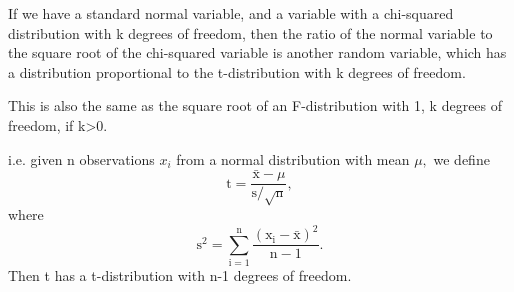 If we have a standard normal variable, and a variable with a chi-squared
distribution with k degrees of freedom, then the ratio of the normal
variable to the square root of the chi-squared variable is another 
random variable, which has a distribution proportional to the t-distribution with k 
degrees of freedom.
\par
This is also the same as the square root of an F-distribution with 1, k degrees of
freedom, if k>0.
\par
i.e. given n observations $x_{i}$  from a normal distribution with
mean $ \mu , $ we define
\[ \mathrm{t} = \frac{\bar{\mathrm{x}} - \mu }
{\mathrm{s} / \sqrt{\mathrm{n}}} , \]
where 
\[ \mathrm{s}^2 = \sum _{\mathrm{i}=1} ^{\mathrm{n}}
\frac{ ( \mathrm{x}_{\mathrm{i}} - \bar{\mathrm{x}} ) ^{2} }
{\mathrm{n}-1} . \]
Then t has a t-distribution with n-1 degrees of freedom.
